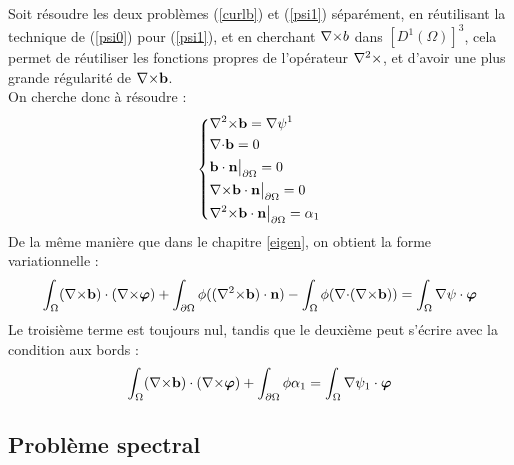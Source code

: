 Soit résoudre les deux problèmes (\ref{curlb}) et (\ref{psi1}) séparément, en réutilisant la technique de (\ref{psi0}) pour (\ref{psi1}), et en cherchant ${\nabla\times} b$ dans $[D^1(\Omega)]^3$, cela permet de réutiliser les fonctions propres de l'opérateur ${\nabla^2\times}$, et d'avoir une plus grande régularité de ${\nabla\times} \mathbf{b}$.\\
On cherche donc à résoudre :
\[\left\{\begin{aligned}
&{\nabla^2\times} \mathbf{b} = {\nabla}\psi^1\\
&{\nabla\cdot} \mathbf{b} = 0\\
&\mathbf{b}\cdot \mathbf{n}{\big\rvert_{\partial\Omega}} = 0\\
&{\nabla\times} \mathbf{b}\cdot \mathbf{n}{\big\rvert_{\partial\Omega}} = 0\\
&{\nabla^2\times} \mathbf{b}\cdot \mathbf{n}{\big\rvert_{\partial\Omega}} = \alpha_1
\end{aligned}\right.\]
De la même manière que dans le chapitre \ref{eigen}, on obtient la forme variationnelle :
\[ \int_\Omega ({\nabla\times}\mathbf{b})\cdot({\nabla\times}\bm{\varphi}) + \int_{\partial\Omega} \phi(({\nabla^2\times}\mathbf{b})\cdot \mathbf{n}) - \int_\Omega \phi({\nabla\cdot}({\nabla\times} \mathbf{b}))  = \int_\Omega {\nabla}\psi\cdot\bm{\varphi} \]
Le troisième terme est toujours nul, tandis que le deuxième peut s'écrire avec la condition aux bords :
\begin{equation}\label{bd1}
\int_\Omega ({\nabla\times}\mathbf{b})\cdot({\nabla\times}\bm{\varphi}) + \int_{\partial\Omega} \phi\alpha_1 = \int_\Omega {\nabla}\psi_1\cdot\bm{\varphi}
\end{equation}

\subsection{Problème spectral}
\label{spectre}

